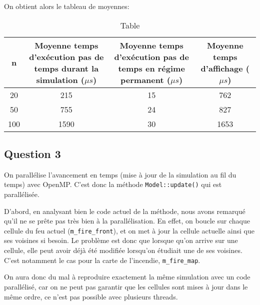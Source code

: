 \documentclass[a4paper, 12pt]{report}
\begin{document}
On obtient alors le tableau de moyennes:
\begin{table}[H]
  \centering
  \begin{tabular}{|c|c|c|c|}
    \hline
    n   & Moyenne temps d'exécution pas de temps durant la simulation ($\mu s$) & Moyenne temps d'exécution pas de temps en régime permanent ($\mu s$) & Moyenne temps d'affichage ($\mu s$) \\
    \hline
    20  & 215                                                                   & 15                                                                   & 762                                 \\
    \hline
    50  & 755                                                                   & 24                                                                   & 827                                 \\
    \hline
    100 & 1590                                                                  & 30                                                                   & 1653                                \\
    \hline
  \end{tabular}
  \caption{Table}
  \label{tab:3x3_table}
\end{table}


\subsection{Question 3}

On parallélise l'avancement en temps (mise à jour de la simulation au fil du temps) avec OpenMP. C'est donc la méthode \texttt{Model::update()} qui est parallélisée.

D'abord, en analysant bien le code actuel de la méthode, nous avons remarqué qu'il ne se prête pas très bien à la parallélisation. En effet, on boucle sur chaque cellule du feu actuel (\texttt{m_fire_front}), et on met à jour la cellule actuelle ainsi que ses voisines si besoin. Le problème est donc que lorsque qu'on arrive sur une cellule, elle peut avoir déjà été modifiée lorsqu'on étudiait une de ses voisines. C'est notamment le cas pour la carte de l'incendie, \texttt{m_fire_map}.

On aura donc du mal à reproduire exactement la même simulation avec un code parallélisé, car on ne peut pas garantir que les cellules sont mises à jour dans le même ordre, ce n'est pas possible avec plusieurs threads.
\end{document}
